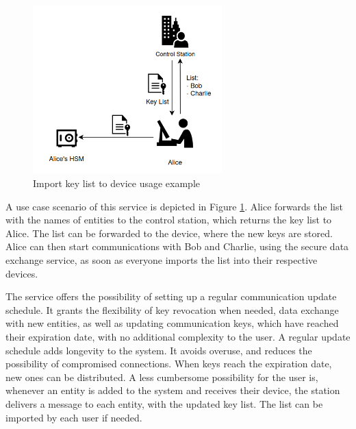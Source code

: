 \begin{figure}[h]
    \centering
    \includegraphics[width=0.65\textwidth]{./Images/user-import-service.png}
    \caption{Import key list to device usage example}
    \label{fig:user:import-service}
\end{figure}

A use case scenario of this service is depicted in Figure \ref{fig:user:import-service}.
Alice forwards the list with the names of entities to the control station, which returns the key list to Alice. The list can be forwarded to the device, where the new keys are stored.
Alice can then start communications with Bob and Charlie, using the secure data exchange service, as soon as everyone imports the list into their respective devices.

The service offers the possibility of setting up a regular communication update schedule. It grants the flexibility of key revocation when needed, data exchange with new entities, as well as updating communication keys, which have reached their expiration date, with no additional complexity to the user.
A regular update schedule adds longevity to the system. It avoids overuse, and reduces the possibility of compromised connections. When keys reach the expiration date, new ones can be distributed.
A less cumbersome possibility for the user is, whenever an entity is added to the system and receives their device, the station delivers a message to each entity, with the updated key list. The list can be imported by each user if needed.


